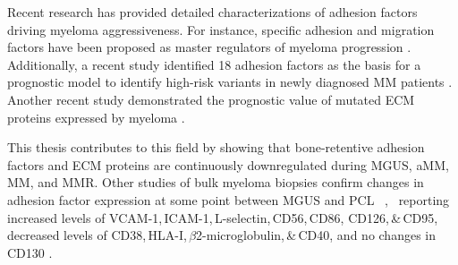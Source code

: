 Recent research has provided detailed characterizations of adhesion factors
driving myeloma aggressiveness. For instance, specific adhesion and migration
factors have been proposed as master regulators of myeloma progression %
\cite{shenProgressionSignatureUnderlies2021}. %
Additionally, a recent study identified 18 adhesion factors as the basis for a
prognostic model to identify high-risk variants in newly diagnosed MM patients
\cite{huDevelopmentCellAdhesionbased2024}. Another recent study demonstrated the
prognostic value of mutated \ac{ECM} proteins expressed by myeloma
\cite{eversPrognosticValueExtracellular2023}.

This thesis contributes to this field by showing that bone-retentive adhesion
factors and \ac{ECM} proteins are continuously downregulated during \ac{MGUS},
\ac{aMM}, \ac{MM}, and \ac{MMR}. Other studies of bulk myeloma biopsies confirm
changes in adhesion factor expression at some point between \ac{MGUS} and
\ac{PCL}%
\,%
,~%
reporting %
increased levels of VCAM-1,\,ICAM-1,\,L-selectin,\,CD56,\,CD86,
CD126,\,\&\,CD95, %
decreased levels of CD38,\,HLA-I,\,$\beta$2-microglobulin,\,\&\,CD40, and %
no changes in CD130 %
\cite{terposIncreasedCirculatingVCAM12016, perez-andresClonalPlasmaCells2005}.


